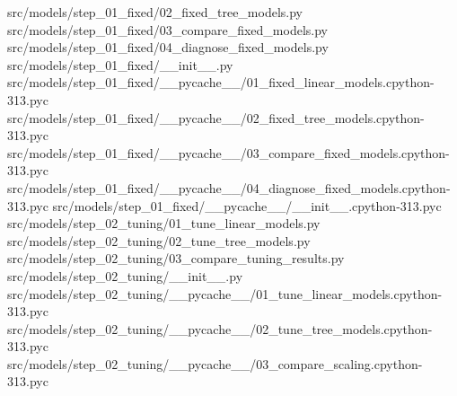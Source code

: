 \documentclass[
  11pt,
  a4paper]{article}
\newenvironment{Shaded}{}{}
\newcommand{\NormalTok}[1]{#1}
\begin{document}
\begin{Shaded}
\begin{Highlighting}[]
\NormalTok{src/models/step\_\allowbreak{}01\_\allowbreak{}fixed/02\_\allowbreak{}fixed\_\allowbreak{}tree\_\allowbreak{}models.py}
\NormalTok{src/models/step\_\allowbreak{}01\_\allowbreak{}fixed/03\_\allowbreak{}compare\_\allowbreak{}fixed\_\allowbreak{}models.py}
\NormalTok{src/models/step\_\allowbreak{}01\_\allowbreak{}fixed/04\_\allowbreak{}diagnose\_\allowbreak{}fixed\_\allowbreak{}models.py}
\NormalTok{src/models/step\_\allowbreak{}01\_\allowbreak{}fixed/\_\allowbreak{}\_\allowbreak{}init\_\allowbreak{}\_\allowbreak{}.py}
\NormalTok{src/models/step\_\allowbreak{}01\_\allowbreak{}fixed/\_\allowbreak{}\_\allowbreak{}pycache\_\allowbreak{}\_\allowbreak{}/01\_\allowbreak{}fixed\_\allowbreak{}linear\_\allowbreak{}models.cpython{-}313.pyc}
\NormalTok{src/models/step\_\allowbreak{}01\_\allowbreak{}fixed/\_\allowbreak{}\_\allowbreak{}pycache\_\allowbreak{}\_\allowbreak{}/02\_\allowbreak{}fixed\_\allowbreak{}tree\_\allowbreak{}models.cpython{-}313.pyc}
\NormalTok{src/models/step\_\allowbreak{}01\_\allowbreak{}fixed/\_\allowbreak{}\_\allowbreak{}pycache\_\allowbreak{}\_\allowbreak{}/03\_\allowbreak{}compare\_\allowbreak{}fixed\_\allowbreak{}models.cpython{-}313.pyc}
\NormalTok{src/models/step\_\allowbreak{}01\_\allowbreak{}fixed/\_\allowbreak{}\_\allowbreak{}pycache\_\allowbreak{}\_\allowbreak{}/04\_\allowbreak{}diagnose\_\allowbreak{}fixed\_\allowbreak{}models.cpython{-}313.pyc}
\NormalTok{src/models/step\_\allowbreak{}01\_\allowbreak{}fixed/\_\allowbreak{}\_\allowbreak{}pycache\_\allowbreak{}\_\allowbreak{}/\_\allowbreak{}\_\allowbreak{}init\_\allowbreak{}\_\allowbreak{}.cpython{-}313.pyc}
\NormalTok{src/models/step\_\allowbreak{}02\_\allowbreak{}tuning/01\_\allowbreak{}tune\_\allowbreak{}linear\_\allowbreak{}models.py}
\NormalTok{src/models/step\_\allowbreak{}02\_\allowbreak{}tuning/02\_\allowbreak{}tune\_\allowbreak{}tree\_\allowbreak{}models.py}
\NormalTok{src/models/step\_\allowbreak{}02\_\allowbreak{}tuning/03\_\allowbreak{}compare\_\allowbreak{}tuning\_\allowbreak{}results.py}
\NormalTok{src/models/step\_\allowbreak{}02\_\allowbreak{}tuning/\_\allowbreak{}\_\allowbreak{}init\_\allowbreak{}\_\allowbreak{}.py}
\NormalTok{src/models/step\_\allowbreak{}02\_\allowbreak{}tuning/\_\allowbreak{}\_\allowbreak{}pycache\_\allowbreak{}\_\allowbreak{}/01\_\allowbreak{}tune\_\allowbreak{}linear\_\allowbreak{}models.cpython{-}313.pyc}
\NormalTok{src/models/step\_\allowbreak{}02\_\allowbreak{}tuning/\_\allowbreak{}\_\allowbreak{}pycache\_\allowbreak{}\_\allowbreak{}/02\_\allowbreak{}tune\_\allowbreak{}tree\_\allowbreak{}models.cpython{-}313.pyc}
\NormalTok{src/models/step\_\allowbreak{}02\_\allowbreak{}tuning/\_\allowbreak{}\_\allowbreak{}pycache\_\allowbreak{}\_\allowbreak{}/03\_\allowbreak{}compare\_\allowbreak{}scaling.cpython{-}313.pyc}

\end{Highlighting}
\end{Shaded}
\end{document}

